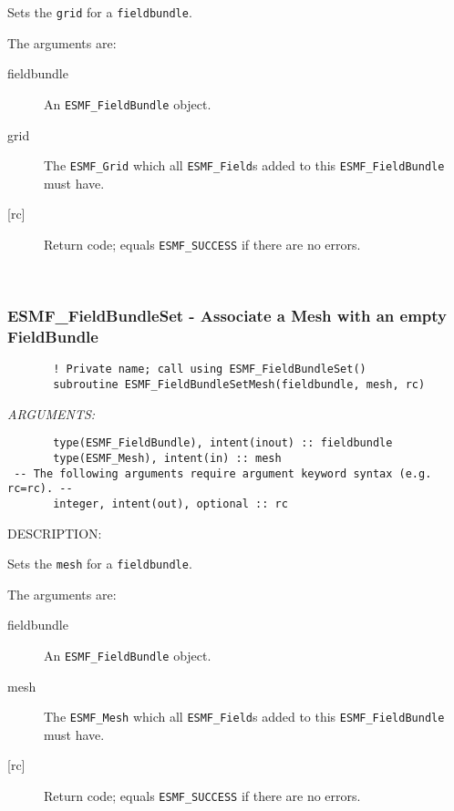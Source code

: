    \begin{sloppypar}
   Sets the {\tt grid} for a {\tt fieldbundle}.
   \end{sloppypar}
  
   The arguments are:
   \begin{description}
   \item [fieldbundle]
   An {\tt ESMF\_FieldBundle} object.
   \item [grid]
   The {\tt ESMF\_Grid} which all {\tt ESMF\_Field}s added to this
   {\tt ESMF\_FieldBundle} must have.
   \item [{[rc]}]
   Return code; equals {\tt ESMF\_SUCCESS} if there are no errors.
   \end{description}
  
   
 
\mbox{}\hrulefill\ 
 
\subsubsection [ESMF\_FieldBundleSet] {ESMF\_FieldBundleSet - Associate a Mesh with an empty FieldBundle}


  
\begin{verbatim}       ! Private name; call using ESMF_FieldBundleSet()
       subroutine ESMF_FieldBundleSetMesh(fieldbundle, mesh, rc)\end{verbatim}{\em ARGUMENTS:}
\begin{verbatim}       type(ESMF_FieldBundle), intent(inout) :: fieldbundle
       type(ESMF_Mesh), intent(in) :: mesh
 -- The following arguments require argument keyword syntax (e.g. rc=rc). --
       integer, intent(out), optional :: rc\end{verbatim}
{\sf DESCRIPTION:\\ }


   \begin{sloppypar}
   Sets the {\tt mesh} for a {\tt fieldbundle}.
   \end{sloppypar}
  
   The arguments are:
   \begin{description}
   \item [fieldbundle]
   An {\tt ESMF\_FieldBundle} object.
   \item [mesh]
   The {\tt ESMF\_Mesh} which all {\tt ESMF\_Field}s added to this
   {\tt ESMF\_FieldBundle} must have.
   \item [{[rc]}]
   Return code; equals {\tt ESMF\_SUCCESS} if there are no errors.
   \end{description}
  
